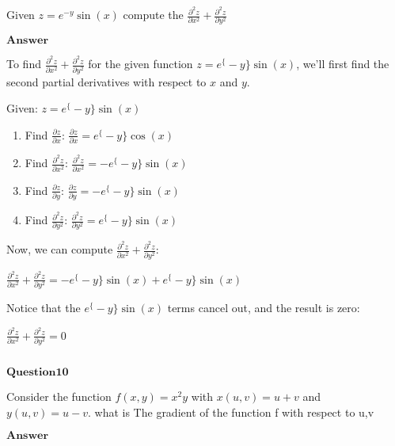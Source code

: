 \documentclass[11pt]{article}
\makeatletter
\newcommand{\boxspacing}{\kern\kvtcb@left@rule\kern\kvtcb@boxsep}
\newcommand{\prompt}[4]{
        {\ttfamily\llap{{\color{#2}[#3]:\hspace{3pt}#4}}\vspace{-\baselineskip}}
    }
\makeatother
\begin{document}
Given $z=e^{-y} \sin(x)$ compute the
$\frac{\partial^2 z}{\partial x^2}+\frac{\partial^2 z}{\partial y^2}$

$\textbf{Answer}$

    To find $ \frac{\partial^2 z}{\partial x^2} +
\frac{\partial^2 z}{\partial y^2} $ for the given function $ z =
e^\{-y\} \sin(x) $, we'll first find the second partial derivatives
with respect to $ x $ and $ y $.

Given: $ z = e^\{-y\} \sin(x) $

\begin{enumerate}
\def\labelenumi{\arabic{enumi}.}
\item
  Find $ \frac{\partial z}{\partial x} $: $
  \frac{\partial z}{\partial x} = e^\{-y\} \cos(x) $
\item
  Find $ \frac{\partial^2 z}{\partial x^2} $: $
  \frac{\partial^2 z}{\partial x^2} = -e^\{-y\} \sin(x) $
\item
  Find $ \frac{\partial z}{\partial y} $: $
  \frac{\partial z}{\partial y} = -e^\{-y\} \sin(x) $
\item
  Find $ \frac{\partial^2 z}{\partial y^2} $: $
  \frac{\partial^2 z}{\partial y^2} = e^\{-y\} \sin(x) $
\end{enumerate}

Now, we can compute $ \frac{\partial^2 z}{\partial x^2} +
\frac{\partial^2 z}{\partial y^2} $:

$ \frac{\partial^2 z}{\partial x^2} + \frac{\partial^2 z}{\partial y^2}
= -e^\{-y\} \sin(x) + e^\{-y\} \sin(x) $

Notice that the $ e^\{-y\} \sin(x) $ terms cancel out, and the
result is zero:

$ \frac{\partial^2 z}{\partial x^2} + \frac{\partial^2 z}{\partial y^2}
= 0 $

    \begin{tcolorbox}[breakable, size=fbox, boxrule=1pt, pad at break*=1mm,colback=cellbackground, colframe=cellborder]
\prompt{In}{incolor}{ }{\boxspacing}
\begin{Verbatim}[commandchars=\\\{\}]

\end{Verbatim}
\end{tcolorbox}

    $\textbf{Question10}$

Consider the function $f(x,y)=x^2y$ with $x(u,v)=u+v$ and
$y(u,v)=u-v$. what is The gradient of the function f with respect to
u,v

$\textbf{Answer}$
\end{document}

